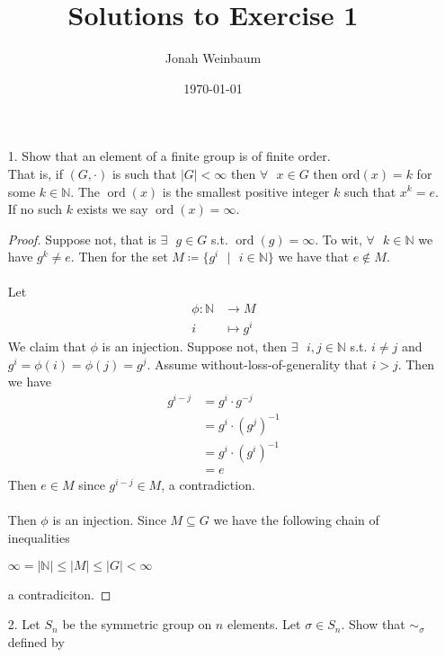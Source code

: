 \documentclass{article}
\begin{document}
\title{Solutions to Exercise 1}
\author{Jonah Weinbaum}
\date{\today}
\maketitle

\begin{itemize}
    \item [1.] Show that an element of a finite group is of finite order. 
      \\That is, if $(G, \cdot)$ is such that $|G| < \infty$ then $\forall\text{ }x\in{G}$ then $\text{ord}(x) = k$ for some $k\in\mathbb{N}$. The $\operatorname{ord}(x)$ is the smallest positive integer $k$ such that $x^k = e$. If no such $k$ exists we say $\operatorname{ord}(x) = \infty$.
      \begin{proof}
        Suppose not, that is $\exists\text{ }g\in{G}$ s.t. $\operatorname{ord}(g) = \infty$. To wit, $\forall\text{ }k\in\mathbb{N}$ we have $g^k\ne e$. Then for the set $M \coloneq \{g^i\text{ }\vert\text{ }i\in\mathbb{N}\}$ we have that $e\notin M$.
        \\\\Let
        \begin{align*}
          \phi: \mathbb{N} &\to M\\
          i &\mapsto g^i
        \end{align*}
        We claim that $\phi$ is an injection. Suppose not, then $\exists\text{ }i,j\in\mathbb{N}$ s.t. $i\ne j$ and $g^i=\phi(i)=\phi(j)=g^j$. Assume without-loss-of-generality that $i > j$. Then we have
        \begin{align*}
          g^{i-j} &= g^i\cdot g^{-j}\\
                  &= g^i\cdot (g^{j})^{-1}\\
                  &= g^i\cdot (g^i)^{-1}\\
          &= e
        \end{align*}
        Then $e\in M$ since $g^{i-j}\in M$, a contradiction.
        \\\\Then $\phi$ is an injection. Since $M\subseteq G$ we have the following chain of inequalities
        \begin{center}
          $\infty = |\mathbb{N}| \le |M| \le |G| < \infty$
        \end{center}
        a contradiciton.
      \end{proof}
    \item [2.]Let $S_n$ be the symmetric group on $n$ elements. Let $\sigma\in S_n$. Show that $\sim_{\sigma}$ defined by 

\end{itemize}
\end{document}
